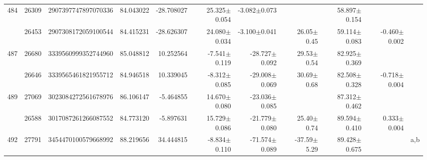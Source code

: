 \documentclass{ws-ijmpd}
\begin{document}
\begin{landscape}
\begin{longtable}{rrrrrrrrrrl}
 \hline 484 &   26309 &      2907397747897070336 &                    84.043022 &                   -28.708027 &                 25.325$\pm$0.054 &                 -3.082$\pm$0.073 &                           &        58.897$\pm$0.154 &                                           &                                                    \\
            &   26453 &      2907308172059100544 &                    84.415231 &                   -28.626307 &                 24.080$\pm$0.034 &                 -3.100$\pm$0.041 &          26.05$\pm$  0.45 &        59.114$\pm$0.083 &                          -0.460$\pm$0.002 &                                                    \\
 \hline 487 &   26680 &      3339560999352744960 &                    85.048812 &                    10.252564 &                 -7.541$\pm$0.119 &                -28.727$\pm$0.092 &          29.53$\pm$  0.54 &        82.925$\pm$0.369 &                                           &                                                    \\
            &   26646 &      3339565461821955712 &                    84.946518 &                    10.339045 &                 -8.312$\pm$0.085 &                -29.008$\pm$0.069 &          30.69$\pm$  0.68 &        82.508$\pm$0.328 &                          -0.718$\pm$0.004 &                                                    \\
 \hline 489 &   27069 &      3023084272561678976 &                    86.106147 &                    -5.464855 &                 14.670$\pm$0.080 &                -23.036$\pm$0.085 &                           &        87.312$\pm$0.462 &                                           &                                                    \\
            &   26588 &      3017087261266087552 &                    84.773120 &                    -5.897631 &                 15.729$\pm$0.086 &                -21.779$\pm$0.080 &          25.40$\pm$  0.74 &        89.594$\pm$0.410 &                           0.333$\pm$0.004 &                                                    \\
 \hline 492 &   27791 &      3454470100579668992 &                    88.219656 &                    34.444815 &                 -8.834$\pm$0.110 &                -71.574$\pm$0.089 &         -37.59$\pm$  5.29 &        89.428$\pm$0.675 &                                           &                                                a,b \\

\end{longtable}
\end{landscape}
\end{document}
